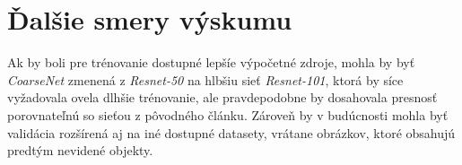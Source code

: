 \documentclass [11pt, a4paper, twocolumn]{article}
\begin{document}
\section{Ďalšie smery výskumu}
Ak by boli pre trénovanie dostupné lepšíe výpočetné zdroje, mohla by byť \textit{CoarseNet} zmenená z \textit{Resnet-50} na hlbšiu sieť \textit{Resnet-101}, ktorá by síce vyžadovala ovela dlhšie trénovanie, ale pravdepodobne by dosahovala presnosť porovnateľnú so sieťou z pôvodného článku. Zároveň by v budúcnosti mohla byť validácia rozšírená aj na iné dostupné datasety, vrátane obrázkov, ktoré obsahujú predtým nevidené objekty.


\newpage


\renewcommand{\refname}{Použitá literatúra}

\end{document}
